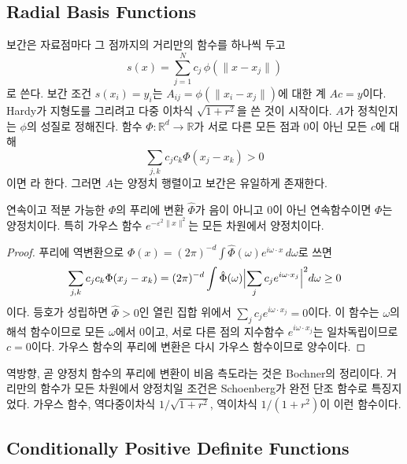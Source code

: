 \subsection{Radial Basis Functions}

 보간은 자료점마다 그 점까지의 거리만의 함수를 하나씩 두고
\[
s(x)=\sum_{j=1}^Nc_j\,\phi(\|x-x_j\|)
\]
로 쓴다. 보간 조건 $s(x_i)=y_i$는 $A_{ij}=\phi(\|x_i-x_j\|)$에 대한 계 $Ac=y$이다. Hardy가 지형도를 그리려고 다중 이차식 $\sqrt{1+r^2}$을 쓴 것이 시작이다\cite{hardy1971}. $A$가 정칙인지는 $\phi$의 성질로 정해진다. 함수 $\Phi:\mathbb R^d\to\mathbb R$가 서로 다른 모든 점과 $0$이 아닌 모든 $c$에 대해
\[
\sum_{j,k}c_jc_k\Phi(x_j-x_k)>0
\]
이면 라 한다. 그러면 $A$는 양정치 행렬이고 보간은 유일하게 존재한다.

\begin{proposition}
\label{prop:fourier-pd}
연속이고 적분 가능한 $\Phi$의 푸리에 변환 $\hat\Phi$가 음이 아니고 $0$이 아닌 연속함수이면 $\Phi$는 양정치이다. 특히 가우스 함수 $e^{-\varepsilon^2\|x\|^2}$는 모든 차원에서 양정치이다.
\end{proposition}

\begin{proof}
푸리에 역변환으로 $\Phi(x)=(2\pi)^{-d}\int\hat\Phi(\omega)e^{i\omega\cdot x}\,d\omega$로 쓰면
\[
\sum_{j,k}c_jc_k\Phi(x_j-x_k)=(2\pi)^{-d}\int\hat\Phi(\omega)\Bigl|\sum_jc_je^{i\omega\cdot x_j}\Bigr|^2d\omega\ge0
\]
이다. 등호가 성립하면 $\hat\Phi>0$인 열린 집합 위에서 $\sum_jc_je^{i\omega\cdot x_j}=0$이다. 이 함수는 $\omega$의 해석 함수이므로 모든 $\omega$에서 $0$이고, 서로 다른 점의 지수함수 $e^{i\omega\cdot x_j}$는 일차독립이므로 $c=0$이다. 가우스 함수의 푸리에 변환은 다시 가우스 함수이므로 양수이다.
\end{proof}

역방향, 곧 양정치 함수의 푸리에 변환이 비음 측도라는 것은 Bochner의 정리이다\cite{bochner1933}. 거리만의 함수가 모든 차원에서 양정치일 조건은 Schoenberg가 완전 단조 함수로 특징지었다\cite{schoenberg1938}. 가우스 함수, 역다중이차식 $1/\sqrt{1+r^2}$, 역이차식 $1/(1+r^2)$이 이런 함수이다.

\subsection{Conditionally Positive Definite Functions}

